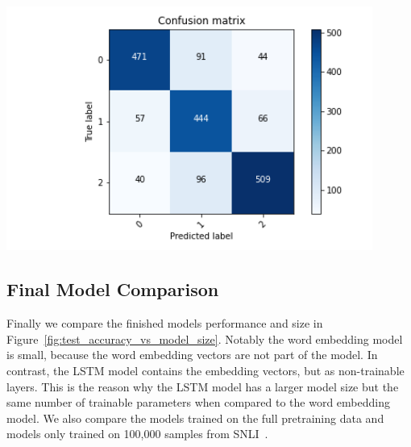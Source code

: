 \documentclass[acmsmall,nonacm]{acmart}
\begin{document}
\vspace*{5ex}
\begin{minipage}[h!]{\textwidth}
  \begin{minipage}[b]{0.49\textwidth}
      \includegraphics[width=0.9\textwidth]{assets/multilingual_roberta_confusion_matrix.png}
      \label{fig:multilingualroberta_model_confusion_matrix}
  \end{minipage}
  \hfill
  \begin{minipage}[b]{0.49\textwidth}
    \centering
      \newline
      \label{tab:multilingualroberta_classification_report}
    \end{minipage}
  \end{minipage}


\subsection{Final Model Comparison}
Finally we compare the finished models performance and size in Figure~\ref{fig:test_accuracy_vs_model_size}. Notably the word embedding model is small, because the word embedding vectors are not part of the model. In contrast, the LSTM model contains the embedding vectors, but as non-trainable layers. This is the reason why the LSTM model has a larger model size but the same number of trainable parameters when compared to the word embedding model. We also compare the models trained on the full pretraining data and models only trained on 100,000 samples from SNLI~\cite{snli-bowman2015}. 
\end{document}
